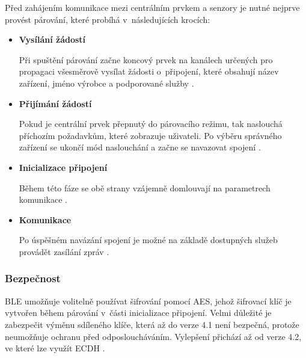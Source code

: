   Před zahájením komunikace mezi centrálním prvkem a senzory je nutné nejprve provést párování, 
  které probíhá v~následujících krocích:
  \begin{itemize}
   \item \textbf{Vysílání žádostí}
   
   Při spuštění párování začne koncový prvek na kanálech určených pro propagaci všesměrově vysílat žádosti o~připojení,
   které obsahují název zařízení, jméno výrobce a podporované služby \cite{ble-attack}.
   
   \item \textbf{Přijímání žádostí}
   
   Pokud je centrální prvek přepnutý do párovacího režimu, tak naslouchá příchozím požadavkům, které zobrazuje uživateli.
   Po výběru správného zařízení se ukončí mód naslouchání a začne se navazovat spojení \cite{ble-attack}.
   
   \item \textbf{Inicializace připojení} 
   
   Během této fáze se obě strany vzájemně domlouvají na parametrech komunikace \cite{ble-attack}.
   \item \textbf{Komunikace}
   
   Po úspěšném navázání spojení je možné na základě dostupných služeb provádět zasílání zpráv \cite{ble-attack}.
  \end{itemize}

 
   \subsubsection{Bezpečnost}
   BLE umožňuje volitelně používat šifrování pomocí AES, jehož šifrovací klíč je 
   vytvořen během párování v~části inicializace připojení. Velmi důležité je zabezpečit 
   výměnu sdíleného klíče, která až do verze 4.1 není bezpečná, protože neumožňuje ochranu
   před odposloucháváním. Vylepšení přichází až od verze 4.2, ve které lze využít ECDH \cite{cesnet-survey}.
   
